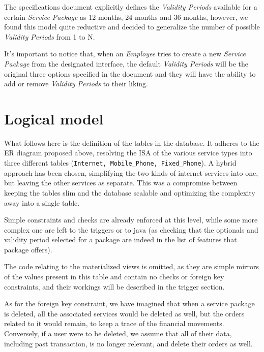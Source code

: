 The specifications document explicitly defines the \textit{Validity Periods} available for a certain \textit{Service Package} as 12 months, 24 months and 36 months, however, we found this model quite reductive and decided to generalize the number of possible \textit{Validity Periods} from 1 to N.

It's important to notice that, when an \textit{Employee} tries to create a new \textit{Service Package} from the designated interface, the default \textit{Validity Periods} will be the original three options specified in the document and they will have the ability to add or remove \textit{Validity Periods} to their liking.


\section{Logical model}
\label{sec:logical_model}

What follows here is the definition of the tables in the database. It adheres to the ER diagram proposed above, resolving the ISA of the various service types into three different tables (\texttt{Internet, Mobile\_Phone, Fixed\_Phone}). A hybrid approach has been chosen, simplifying the two kinds of internet services into one, but leaving the other services as separate. This was a compromise between keeping the tables slim and the database scalable and optimizing the complexity away into a single table.

Simple constraints and checks are already enforced at this level, while some more complex one are left to the triggers or to java (as checking that the optionals and validity period selected for a package are indeed in the list of features that package offers).

The code relating to the materialized views is omitted, as they are simple mirrors of the values present in this table and contain no checks or foreign key constraints, and their workings will be described in the trigger section.

As for the foreign key constraint, we have imagined that when a service package is deleted, all the associated services would be deleted as well, but the orders related to it would remain, to keep a trace of the financial movements. Conversely, if a user were to be deleted, we assume that all of their data, including past transaction, is no longer relevant, and delete their orders as well.

